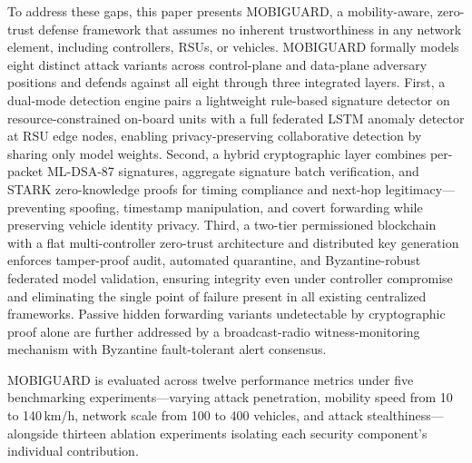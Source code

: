 \documentclass[12pt, a4paper]{report}
\begin{document}
To address these gaps, this paper presents MOBIGUARD, a mobility-aware,
zero-trust defense framework that assumes no inherent trustworthiness in
any network element, including controllers, RSUs, or vehicles. MOBIGUARD
formally models eight distinct attack variants across control-plane and
data-plane adversary positions and defends against all eight through three
integrated layers. First, a dual-mode detection engine pairs a lightweight
rule-based signature detector on resource-constrained on-board units with
a full federated LSTM anomaly detector at RSU edge nodes, enabling
privacy-preserving collaborative detection by sharing only model weights.
Second, a hybrid cryptographic layer combines per-packet ML-DSA-87 signatures,
aggregate signature batch verification, and
\ac{STARK} zero-knowledge proofs for timing
compliance and next-hop legitimacy---preventing
spoofing, timestamp manipulation, and covert
forwarding while preserving vehicle identity privacy.
Third, a two-tier permissioned blockchain with a flat
multi-controller zero-trust architecture and
distributed key generation enforces tamper-proof
audit, automated quarantine, and Byzantine-robust
federated model validation, ensuring integrity even
under controller compromise and eliminating the
single point of failure present in all existing
centralized frameworks. Passive hidden forwarding
variants undetectable by cryptographic proof alone
are further addressed by a broadcast-radio
witness-monitoring mechanism with Byzantine
fault-tolerant alert consensus.

MOBIGUARD is evaluated across twelve performance
metrics under five benchmarking experiments---varying
attack penetration, mobility speed from 10 to
140\,km/h, network scale from 100 to 400 vehicles,
and attack stealthiness---alongside thirteen ablation
experiments isolating each security component's
individual contribution.



\tableofcontents
\newpage

\listoffigures
\newpage

\listoftables
\newpage

\acuseall %
\printacronyms
\newpage
\end{document}
